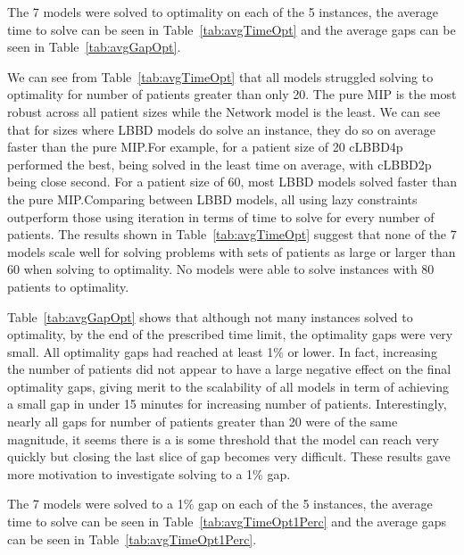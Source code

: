 The 7 models were solved to optimality on each of the 5 instances, the average time to solve can be seen in Table~\ref{tab:avgTimeOpt} and the average gaps can be seen in Table~\ref{tab:avgGapOpt}.



We can see from Table~\ref{tab:avgTimeOpt} that all models struggled solving to optimality for number of patients greater than only 20. The pure MIP is the most robust across all patient sizes while the Network model is the least. We can see that for sizes where LBBD models do solve an instance, they do so on average faster than the pure MIP.\@ For example, for a patient size of 20 cLBBD4p performed the best, being solved in the least time on average, with cLBBD2p being close second. For a patient size of 60, most LBBD models solved faster than the pure MIP.\@ Comparing between LBBD models, all using lazy constraints outperform those using iteration in terms of time to solve for every number of patients. The results shown in Table~\ref{tab:avgTimeOpt} suggest that none of the 7 models scale well for solving problems with sets of patients as large or larger than 60 when solving to optimality. No models were able to solve instances with 80 patients to optimality. 



Table~\ref{tab:avgGapOpt} shows that although not many instances solved to optimality, by the end of the prescribed time limit, the optimality gaps were very small. All optimality gaps had reached at least 1\% or lower. In fact, increasing the number of patients did not appear to have a large negative effect on the final optimality gaps, giving merit to the scalability of all models in term of achieving a small gap in under 15 minutes for increasing number of patients. Interestingly, nearly all gaps for number of patients greater than 20 were of the same magnitude, it seems there is a is some threshold that the model can reach very quickly but closing the last slice of gap becomes very difficult. These results gave more motivation to investigate solving to a 1\% gap.



The 7 models were solved to a 1\% gap on each of the 5 instances, the average time to solve can be seen in Table~\ref{tab:avgTimeOpt1Perc} and the average gaps can be seen in Table~\ref{tab:avgTimeOpt1Perc}.

